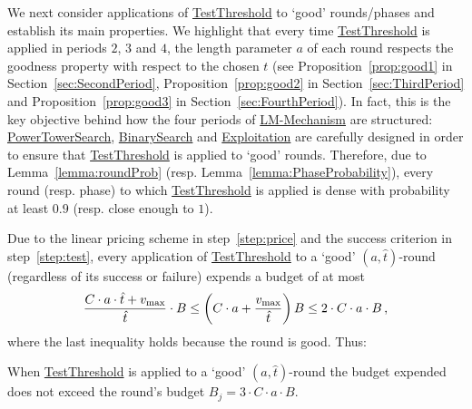 
We next consider applications of \hyperref[alg:TestTHRESHOLD]{TestThreshold} to `good' rounds/phases and establish its main properties. We highlight that every time \hyperref[alg:TestTHRESHOLD]{TestThreshold} is applied in periods $2$, $3$ and $4$, the length parameter $a$ of each round respects the goodness property with respect to the chosen $t$ (see Proposition~\ref{prop:good1} in Section~\ref{sec:SecondPeriod}, Proposition~\ref{prop:good2} in Section~\ref{sec:ThirdPeriod} and Proposition~\ref{prop:good3} in Section~\ref{sec:FourthPeriod}). 
%
In fact, this is the key objective behind how the four periods of \hyperref[alg:LMMECH]{LM-Mechanism} are structured: 
\hyperref[alg:PowerTower]{PowerTowerSearch}, \hyperref[alg:binarysearch]{BinarySearch} and 
\hyperref[alg:exploitation]{Exploitation} are carefully designed in order to ensure that  \hyperref[alg:TestTHRESHOLD]{TestThreshold} is applied to `good' rounds.
%
Therefore, due to Lemma~\ref{lemma:roundProb} (resp. Lemma~\ref{lemma:PhaseProbability}), every round (resp. phase) to which \hyperref[alg:TestTHRESHOLD]{TestThreshold} is applied is dense with probability at least $0.9$ (resp. close enough to $1$).

Due to the linear pricing scheme in step~\ref{step:price} and the success criterion in  step~\ref{step:test}, every application of \hyperref[alg:TestTHRESHOLD]{TestThreshold} to a `good' $(a,\hat{t})$-round (regardless of its success or failure) expends a budget of at most 
%
\[ \frac{C \cdot a \cdot \hat{t} + v_{\text{max}}}{\hat{t}} \cdot B \leq \left( C \cdot a + \frac{v_{\text{max}}}{\hat{t}}\right) B \leq 2 \cdot C \cdot a \cdot B\,,
\]
%
where the last inequality holds because the round is good. Thus:

\begin{property}\label{property:a}
When \hyperref[alg:TestTHRESHOLD]{TestThreshold} is applied to a `good' $\left(a,\hat{t}\right)$-round the budget expended does not exceed the round's budget $B_j = 3\cdot C\cdot a\cdot B$. 
\end{property}


